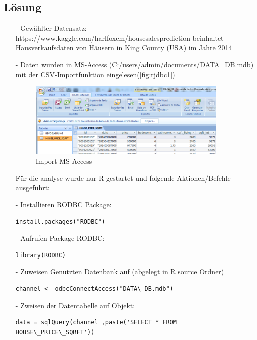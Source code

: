 \subsection*{Lösung}
\begin{itemize}
\item[-]Gewählter Datensatz: https://www.kaggle.com/harlfoxem/housesalesprediction beinhaltet Hausverkaufsdaten von Häusern in King County (USA) im Jahre 2014
\item[-]Daten wurden in MS-Access (C:/users/admin/documents/DATA\_DB.mdb) mit der CSV-Importfunktion eingelesen(\autoref{fig:rjdbc1})
\begin{figure}[!htb]
        \begin{minipage}{1\textwidth}
                \centering
                \includegraphics[width=0.90\textwidth]{pics/rjdbc1.png}\par\vspace{0cm}
                \caption{Import MS-Access}
                \label{fig:rjdbc1}
        \end{minipage}
\end{figure}

Für die analyse wurde nur R gestartet und folgende Aktionen/Befehle ausgeführt:
\item[-]Installieren RODBC Package:
\begin{lstlisting}
install.packages("RODBC")
\end{lstlisting}
\item[-]Aufrufen Package RODBC:
\begin{lstlisting}
library(RODBC)
\end{lstlisting}
\item[-]Zuweisen Genutzten Datenbank auf (abgelegt in R source Ordner)
\begin{lstlisting}
channel <- odbcConnectAccess("DATA\_DB.mdb")
\end{lstlisting}

\item[-]Zweisen der Datentabelle auf Objekt:
\begin{lstlisting}
data = sqlQuery(channel ,paste('SELECT * FROM HOUSE\_PRICE\_SQRFT'))
\end{lstlisting}


\end{itemize}
